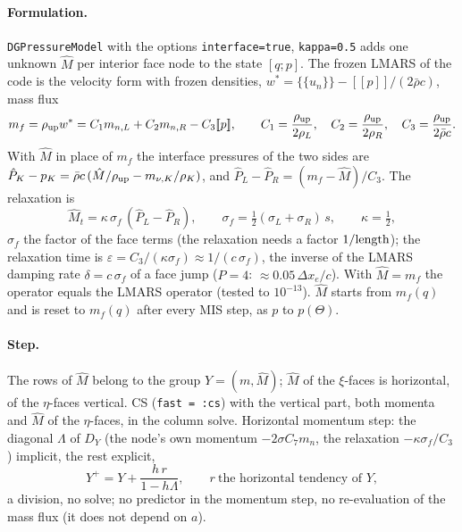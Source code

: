 \documentclass[11pt,a4paper]{article}
\newcommand{\avg}[1]{\{\!\{#1\}\!\}}
\newcommand{\jump}[1]{[\![#1]\!]}
\newcommand{\code}[1]{\texttt{#1}}
\begin{document}
\paragraph{Formulation.} \code{DGPressureModel} with the options \code{interface=true}, \code{kappa=0.5} adds one unknown $\hat M$
per interior face node to the state $[q;p]$. The frozen LMARS of the code is the velocity form with frozen densities, $w^*=\avg{u_n}-\jump p/(2\bar\rho c)$,
mass flux
\[
m_f=\rho_{\rm up}w^*=C_1m_{n,L}+C_2m_{n,R}-C_3\jump p,\qquad C_1=\frac{\rho_{\rm up}}{2\rho_L},\quad C_2=\frac{\rho_{\rm up}}{2\rho_R},\quad C_3=\frac{\rho_{\rm up}}{2\bar\rho c}.
\]
With
$\hat M$ in place of $m_f$ the interface pressures of the two sides are $\hat P_K-p_K=\bar\rho c\,(\hat M/\rho_{\rm up}-m_{\nu,K}/\rho_K)$, and
$\hat P_L-\hat P_R=(m_f-\hat M)/C_3$. The relaxation is
\[
\hat M_t=\kappa\,\sigma_f\,(\hat P_L-\hat P_R),\qquad \sigma_f=\tfrac12(\sigma_L+\sigma_R)\,s,\qquad \kappa=\tfrac12,
\]
$\sigma_f$ the factor of the face terms (the relaxation needs a factor $1/{\rm length}$); the relaxation time is $\varepsilon=C_3/(\kappa\sigma_f)\approx1/(c\,\sigma_f)$, the
inverse of the LMARS damping rate $\delta=c\,\sigma_f$ of a face jump ($P=4$: $\approx0.05\,\Delta x_e/c$). With $\hat M=m_f$ the operator equals the LMARS
operator (tested to $10^{-13}$). $\hat M$ starts from $m_f(q)$ and is reset to $m_f(q)$ after every MIS step, as $p$ to $p(\Theta)$.

\paragraph{Step.} The rows of $\hat M$ belong to the group $Y=(m,\hat M)$; $\hat M$ of the $\xi$-faces is horizontal, of the $\eta$-faces vertical. CS (\code{fast = :cs})
with the vertical part, both momenta and $\hat M$ of the $\eta$-faces, in the column solve. Horizontal momentum step: the diagonal $\Lambda$ of $D_Y$ (the
node's own momentum $-2\sigma C_7 m_n$, the relaxation $-\kappa\sigma_f/C_3$) implicit, the rest explicit,
\[
Y^+=Y+\frac{h\,r}{1-h\Lambda},\qquad r\ \text{the horizontal tendency of }Y,
\]
a division, no solve; no predictor in the momentum step, no re-evaluation of the mass flux (it does not depend on $a$).
\end{document}
